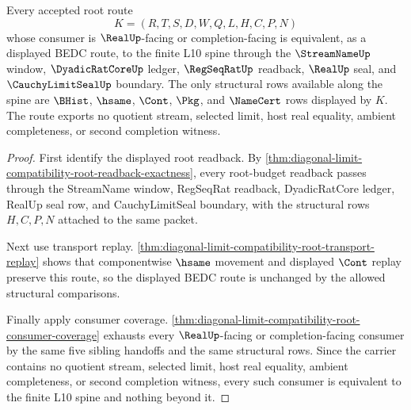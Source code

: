 \begin{theorem}
\label{thm:diagonal-limit-compatibility-root-l10-spine-exhaustion}
Every accepted root route
$$
K=(R,T,S,D,W,Q,L,H,C,P,N)
$$
whose consumer is $\RealUp$-facing or completion-facing is equivalent, as a displayed BEDC route, to the finite L10 spine through the $\StreamNameUp$ window, $\DyadicRatCoreUp$ ledger, $\RegSeqRatUp$ readback, $\RealUp$ seal, and $\CauchyLimitSealUp$ boundary. The only structural rows available along the spine are $\BHist$, $\hsame$, $\Cont$, $\Pkg$, and $\NameCert$ rows displayed by $K$. The route exports no quotient stream, selected limit, host real equality, ambient completeness, or second completion witness.
\end{theorem}
\begin{proof}
First identify the displayed root readback. By \autoref{thm:diagonal-limit-compatibility-root-readback-exactness}, every root-budget readback passes through the StreamName window, RegSeqRat readback, DyadicRatCore ledger, RealUp seal row, and CauchyLimitSeal boundary, with the structural rows $H,C,P,N$ attached to the same packet.

Next use transport replay. \autoref{thm:diagonal-limit-compatibility-root-transport-replay} shows that componentwise $\hsame$ movement and displayed $\Cont$ replay preserve this route, so the displayed BEDC route is unchanged by the allowed structural comparisons.

Finally apply consumer coverage. \autoref{thm:diagonal-limit-compatibility-root-consumer-coverage} exhausts every $\RealUp$-facing or completion-facing consumer by the same five sibling handoffs and the same structural rows. Since the carrier contains no quotient stream, selected limit, host real equality, ambient completeness, or second completion witness, every such consumer is equivalent to the finite L10 spine and nothing beyond it.
\end{proof}

